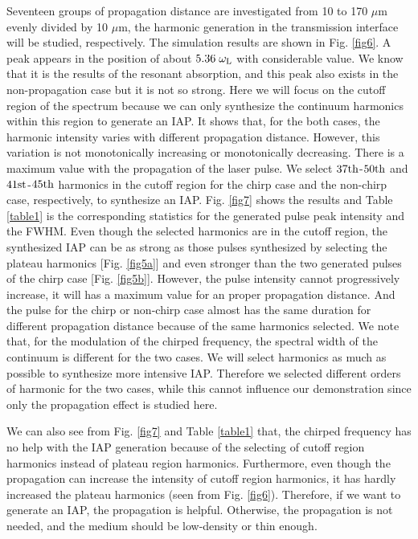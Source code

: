 \documentclass[10pt,letterpaper]{article}
\begin{document}
Seventeen groups of propagation distance are investigated from 10 to 170 $ \mu $m evenly divided by 10 $ \mu $m, the harmonic generation in the transmission interface will be studied, respectively.
The simulation results are shown in Fig. \ref{fig6}. A peak appears in the position of about  $ 5.36\;\omega_{\rm{L}} $ with considerable value. We know that it is the results of the resonant absorption, and this peak also exists in the non-propagation case but it is not so strong. Here we will focus on the cutoff region of the spectrum because we can only synthesize the continuum harmonics within this region to generate an IAP. It shows that, for the both cases, the harmonic intensity varies with different propagation distance. However, this variation is not monotonically increasing or monotonically decreasing. There is a maximum value with the propagation of the laser pulse. We select $37\rm{th}$-$50\rm{th}$ and $41\rm{st}$-$45\rm{th}$ harmonics in the cutoff region for the chirp case and the non-chirp case, respectively, to synthesize an IAP. Fig. \ref{fig7} shows the results and Table \ref{table1} is the corresponding statistics for the generated pulse peak intensity and the FWHM. Even though the selected harmonics are in the cutoff region, the synthesized IAP can be as strong as those pulses synthesized by selecting the plateau harmonics [Fig. \ref{fig5a}] and even stronger than the two generated pulses of the chirp case [Fig. \ref{fig5b}]. However, the pulse intensity cannot progressively increase, it will has a maximum value for an proper propagation distance. And the pulse for the chirp or non-chirp case almost has the same duration for different propagation distance because of the same harmonics selected. We note that, for the modulation of the chirped frequency, the spectral width of the continuum is different for the two cases. We will select harmonics as much as possible to synthesize more intensive IAP. Therefore we selected different orders of harmonic for the two cases, while this cannot influence our demonstration  since only the propagation effect is studied here.

We can also see from Fig. \ref{fig7} and Table \ref{table1} that, the chirped frequency has no help with the IAP generation because of the selecting of cutoff region harmonics instead of plateau region harmonics. Furthermore, even though the propagation can increase the intensity of cutoff region harmonics, it has hardly increased the plateau harmonics (seen from Fig. \ref{fig6}). Therefore, if we want to generate an IAP, the propagation is helpful. Otherwise, the propagation is not needed, and the medium should be low-density or thin enough.
\end{document}
